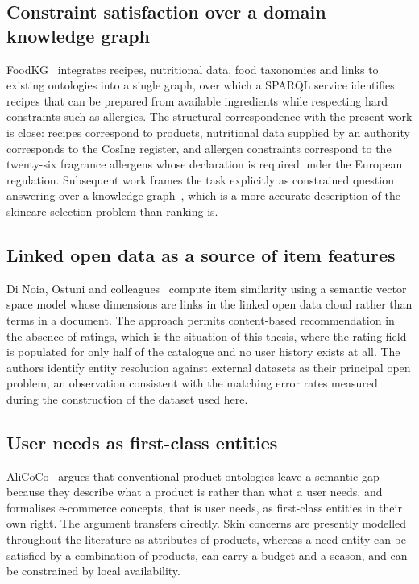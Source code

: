 \subsection{Constraint satisfaction over a domain knowledge graph}

FoodKG~\cite{haussmann2019foodkg} integrates recipes, nutritional data, food
taxonomies and links to existing ontologies into a single graph, over which a
SPARQL service identifies recipes that can be prepared from available
ingredients while respecting hard constraints such as allergies. The structural
correspondence with the present work is close: recipes correspond to products,
nutritional data supplied by an authority corresponds to the CosIng register,
and allergen constraints correspond to the twenty-six fragrance allergens whose
declaration is required under the European regulation. Subsequent work frames
the task explicitly as constrained question answering over a knowledge
graph~\cite{chen2021constrained}, which is a more accurate description of the
skincare selection problem than ranking is.

\subsection{Linked open data as a source of item features}

Di Noia, Ostuni and colleagues~\cite{dinoia2012lod,ostuni2013topn,dinoia2015wims}
compute item similarity using a semantic vector space model whose dimensions are
links in the linked open data cloud rather than terms in a document. The
approach permits content-based recommendation in the absence of ratings, which
is the situation of this thesis, where the rating field is populated for only
half of the catalogue and no user history exists at all. The authors identify
entity resolution against external datasets as their principal open problem, an
observation consistent with the matching error rates measured during the
construction of the dataset used here.

\subsection{User needs as first-class entities}

AliCoCo~\cite{alicoco2020} argues that conventional product ontologies leave a
semantic gap because they describe what a product is rather than what a user
needs, and formalises e-commerce concepts, that is user needs, as first-class
entities in their own right. The argument transfers directly. Skin concerns are
presently modelled throughout the literature as attributes of products, whereas
a need entity can be satisfied by a combination of products, can carry a budget
and a season, and can be constrained by local availability.

